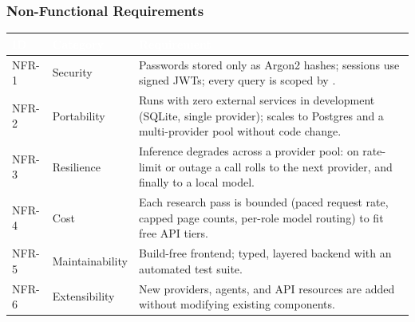 \documentclass[11pt,a4paper]{article}
\newcommand{\code}[1]{\leavevmode{\color{darkblue}\texttt{#1}}}
\begin{document}
\subsubsection{Non-Functional Requirements}
\begin{tabularx}{\linewidth}{|C{1.35cm}|L{2.7cm}|X|}
\hline
{}\textcolor{white}{\textbf{ID}} & \textcolor{white}{\textbf{Category}} & \textcolor{white}{\textbf{Requirement}} \\
\hline
\mbox{NFR-1} & Security & Passwords stored only as Argon2 hashes; sessions use signed JWTs; every query is scoped by \code{user\_id}. \\
\mbox{NFR-2} & Portability & Runs with zero external services in development (SQLite, single provider); scales to Postgres and a multi-provider pool without code change. \\
\mbox{NFR-3} & Resilience & Inference degrades across a provider pool: on rate-limit or outage a call rolls to the next provider, and finally to a local model. \\
\mbox{NFR-4} & Cost & Each research pass is bounded (paced request rate, capped page counts, per-role model routing) to fit free API tiers. \\
\mbox{NFR-5} & Maintainability & Build-free frontend; typed, layered backend with an automated test suite. \\
\mbox{NFR-6} & Extensibility & New providers, agents, and API resources are added without modifying existing components. \\
\hline
\end{tabularx}
\end{document}
